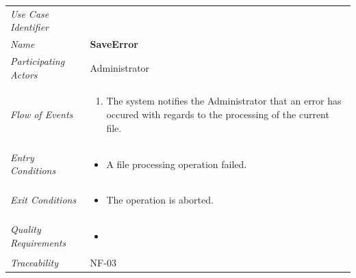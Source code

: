 \documentclass[12pt,letterpaper]{article}
\begin{document}
\begin{center}
	\begin{tabu} to 
		\toprule
		Use Case Identifier & \saveerror{} \\
		Name & {\bf SaveError} \\
		Participating Actors & Administrator \\
		Flow of Events & 
	    \begin{enumerate}[topsep=-1em]
		    \item The system notifies the Administrator that an error has occured with regards to the processing of
		    the current file.
		\end{enumerate} \\

		Entry Conditions &
		\begin{itemize}[topsep=-1em]
		    \item A file processing operation failed.
        \end{itemize} \\

		Exit Conditions &
		\begin{itemize}[topsep=-1em]
		    \item The operation is aborted.
        \end{itemize} \\

		Quality Requirements &
		\begin{itemize}[topsep=-1em]
		    \item 
        \end{itemize} \\

		Traceability & NF-03 \\
		\toprule
	\end{tabu}
\end{center}
\end{document}

